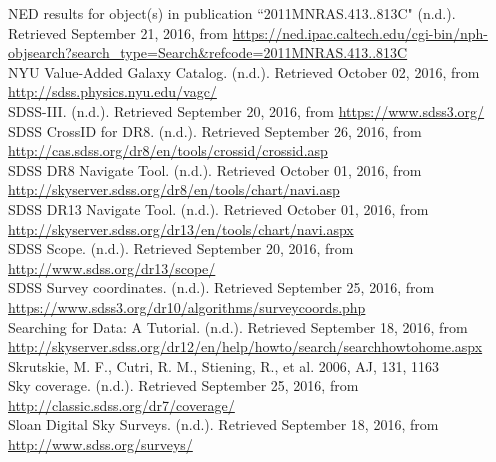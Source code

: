 \documentclass[10pt,letterpaper]{article}
\begin{document}
\begin{thebibliography}{1}
 NED results for object(s) in publication ``2011MNRAS.413..813C" (n.d.). Retrieved September 21, 2016, from \url{https://ned.ipac.caltech.edu/cgi-bin/nph-objsearch?search_type=Search&refcode=2011MNRAS.413..813C}\\

 NYU Value-Added Galaxy Catalog. (n.d.). Retrieved October 02, 2016, from \url{http://sdss.physics.nyu.edu/vagc/}\\

 SDSS-III. (n.d.). Retrieved September 20, 2016, from \url{https://www.sdss3.org/}\\

 SDSS CrossID for DR8. (n.d.). Retrieved September 26, 2016, from \url{http://cas.sdss.org/dr8/en/tools/crossid/crossid.asp}\\

 SDSS DR8 Navigate Tool. (n.d.). Retrieved October 01, 2016, from \url{http://skyserver.sdss.org/dr8/en/tools/chart/navi.asp}\\

 SDSS DR13 Navigate Tool. (n.d.). Retrieved October 01, 2016, from \url{http://skyserver.sdss.org/dr13/en/tools/chart/navi.aspx}\\

 SDSS Scope. (n.d.). Retrieved September 20, 2016, from \url{http://www.sdss.org/dr13/scope/}\\

 SDSS Survey coordinates. (n.d.). Retrieved September 25, 2016, from \url{https://www.sdss3.org/dr10/algorithms/surveycoords.php}\\

 Searching for Data: A Tutorial. (n.d.). Retrieved September 18, 2016, from \url{http://skyserver.sdss.org/dr12/en/help/howto/search/searchhowtohome.aspx}\\

 Skrutskie, M. F., Cutri, R. M., Stiening, R., et al. 2006, AJ, 131, 1163\\

 Sky coverage. (n.d.). Retrieved September 25, 2016, from \url{http://classic.sdss.org/dr7/coverage/}\\

 Sloan Digital Sky Surveys. (n.d.). Retrieved September 18, 2016, from \url{http://www.sdss.org/surveys/}\\


\end{thebibliography}
\end{document}
